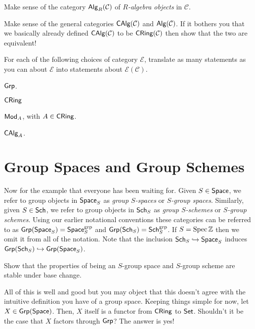 \documentclass[11pt]{article}
\renewcommand{\C}{\mathcal{C}}
\newcommand{\EE}{\mathcal{E}}
\begin{document}
\begin{exercise}
Make sense of the category $\Alg_R(\C)$ of \emph{$R$-algebra objects} in $\C$.
\end{exercise}

\begin{exercise}
Make sense of the general categories $\CAlg(\C)$ and $\Alg(\C)$. If it bothers you that we basically already defined $\CAlg(\C)$ to be $\CRing(\C)$ then show that the two are equivalent!
\end{exercise}

\begin{exercise}
For each of the following choices of category $\EE$, translate as many statements as you can about $\EE$ into statements about $\EE(\C)$.
\begin{enum}{\arabic}
\item $\operatorname{\mathsf{Grp}}$.

\item $\operatorname{\mathsf{CRing}}$

\item $\operatorname{\mathsf{Mod}}_A$, with $A\in\operatorname{\mathsf{CRing}}$.

\item $\operatorname{\mathsf{CAlg}}_A$.
\end{enum}
\end{exercise} 

\section{Group Spaces and Group Schemes}
Now for the example that everyone has been waiting for. Given $S\in\operatorname{\mathsf{Space}}$, we refer to group objects in $\operatorname{\mathsf{Space}}_S$ as \emph{group $S$-spaces} or \emph{$S$-group spaces}. Similarly, given $S\in\operatorname{\mathsf{Sch}}$, we refer to group objects in $\operatorname{\mathsf{Sch}}_S$ as \emph{group $S$-schemes} or \emph{$S$-group schemes}. Using our earlier notational conventions these categories can be referred to as $\operatorname{\mathsf{Grp}}(\operatorname{\mathsf{Space}}_S)=\operatorname{\mathsf{Space}}_S^{\operatorname{grp}}$ and $\operatorname{\mathsf{Grp}}(\operatorname{\mathsf{Sch}}_S)=\operatorname{\mathsf{Sch}}_S^{\operatorname{grp}}$. If $S=\operatorname{Spec}\mathbb{Z}$ then we omit it from all of the notation. Note that the inclusion $\operatorname{\mathsf{Sch}}_S\hookrightarrow\operatorname{\mathsf{Space}}_S$ induces $\operatorname{\mathsf{Grp}}(\operatorname{\mathsf{Sch}}_S)\hookrightarrow\operatorname{\mathsf{Grp}}(\operatorname{\mathsf{Space}}_S)$.

\begin{exercise}
Show that the properties of being an $S$-group space and $S$-group scheme are stable under base change.
\end{exercise}

All of this is well and good but you may object that this doesn't agree with the intuitive definition you have of a group space. Keeping things simple for now, let $X\in\operatorname{\mathsf{Grp}}(\operatorname{\mathsf{Space}})$. Then, $X$ itself is a functor from $\operatorname{\mathsf{CRing}}$ to $\operatorname{\mathsf{Set}}$. Shouldn't it be the case that $X$ factors through $\operatorname{\mathsf{Grp}}$? The answer is yes! 
\end{document}
